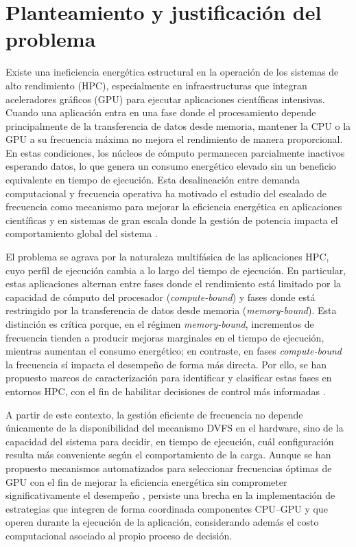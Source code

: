 \documentclass[12pt,oneside,spanish]{book}
\begin{document}

\section*{Planteamiento y justificación del problema}

Existe una ineficiencia energética estructural en la operación de los sistemas de alto rendimiento (HPC), especialmente en infraestructuras que integran aceleradores gráficos (GPU) para ejecutar aplicaciones científicas intensivas. Cuando una aplicación entra en una fase donde el procesamiento depende principalmente de la transferencia de datos desde memoria, mantener la CPU o la GPU a su frecuencia máxima no mejora el rendimiento de manera proporcional. En estas condiciones, los núcleos de cómputo permanecen parcialmente inactivos esperando datos, lo que genera un consumo energético elevado sin un beneficio equivalente en tiempo de ejecución. Esta desalineación entre demanda computacional y frecuencia operativa ha motivado el estudio del escalado de frecuencia como mecanismo para mejorar la eficiencia energética en aplicaciones científicas \cite{Simsek2024} y en sistemas de gran escala donde la gestión de potencia impacta el comportamiento global del sistema \cite{Costa2025}.

El problema se agrava por la naturaleza multifásica de las aplicaciones HPC, cuyo perfil de ejecución cambia a lo largo del tiempo de ejecución. En particular, estas aplicaciones alternan entre fases donde el rendimiento está limitado por la capacidad de cómputo del procesador (\textit{compute-bound}) y fases donde está restringido por la transferencia de datos desde memoria (\textit{memory-bound}). Esta distinción es crítica porque, en el régimen \textit{memory-bound}, incrementos de frecuencia tienden a producir mejoras marginales en el tiempo de ejecución, mientras aumentan el consumo energético; en contraste, en fases \textit{compute-bound} la frecuencia sí impacta el desempeño de forma más directa. Por ello, se han propuesto marcos de caracterización para identificar y clasificar estas fases en entornos HPC, con el fin de habilitar decisiones de control más informadas \cite{Antici2024,Calore2017}.

A partir de este contexto, la gestión eficiente de frecuencia no depende únicamente de la disponibilidad del mecanismo DVFS en el hardware, sino de la capacidad del sistema para decidir, en tiempo de ejecución, cuál configuración resulta más conveniente según el comportamiento de la carga. Aunque se han propuesto mecanismos automatizados para seleccionar frecuencias óptimas de GPU con el fin de mejorar la eficiencia energética sin comprometer significativamente el desempeño \cite{Ali2023}, persiste una brecha en la implementación de estrategias que integren de forma coordinada componentes CPU--GPU y que operen durante la ejecución de la aplicación, considerando además el costo computacional asociado al propio proceso de decisión.
\end{document}
